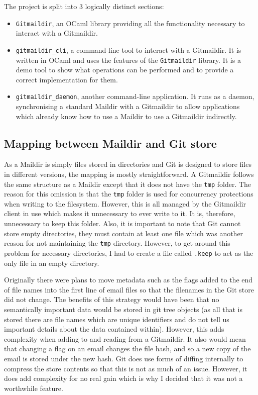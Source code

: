 The project is split into 3 logically distinct sections:
\begin{itemize}
  \item \texttt{Gitmaildir}, an OCaml library providing all the functionality necessary to interact with a Gitmaildir.
  \item \texttt{gitmaildir\_cli}, a command-line tool to interact with a Gitmaildir. It is written in OCaml and uses the features of the \texttt{Gitmaildir} library. It is a demo tool to show what operations can be performed and to provide a correct implementation for them.
  \item \texttt{gitmaildir\_daemon}, another command-line application. It runs as a daemon, synchronising a standard Maildir with a Gitmaildir to allow applications which already know how to use a Maildir to use a Gitmaildir indirectly.
\end{itemize}

\subsection{Mapping between Maildir and Git store} \label{section:mapping}

As a Maildir is simply files stored in directories and Git is designed to store files in different versions, the mapping is mostly straightforward. A Gitmaildir follows the same structure as a Maildir except that it does not have the \texttt{tmp} folder. The reason for this omission is that the \texttt{tmp} folder is used for concurrency protections when writing to the filesystem. However, this is all managed by the Gitmaildir client in use which makes it unnecessary to ever write to it. It is, therefore, unnecessary to keep this folder. Also, it is important to note that Git cannot store empty directories, they must contain at least one file which was another reason for not maintaining the \texttt{tmp} directory. However, to get around this problem for necessary directories, I had to create a file called \texttt{.keep} to act as the only file in an empty directory.

Originally there were plans to move metadata such as the flags added to the end of file names into the first line of email files so that the filenames in the Git store did not change. The benefits of this strategy would have been that no semantically important data would be stored in git tree objects (as all that is stored there are file names which are unique identifiers and do not tell us important details about the data contained within). However, this adds complexity when adding to and reading from a Gitmaildir. It also would mean that changing a flag on an email changes the file hash, and so a new copy of the email is stored under the new hash. Git does use forms of diffing internally to compress the store contents so that this is not as much of an issue. However, it does add complexity for no real gain which is why I decided that it was not a worthwhile feature.

